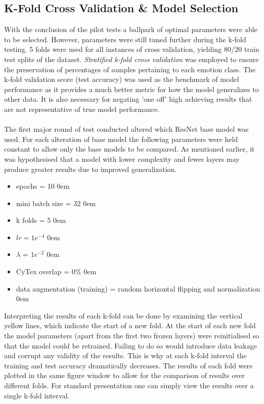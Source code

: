 \subsection{K-Fold Cross Validation \& Model Selection}
With the conclusion of the pilot tests a ballpark of optimal parameters were able to be selected. However, parameters were still tuned further during the k-fold testing. 5 folds were used for all instances of cross validation, yielding 80/20 train test splits of the dataset. \textit{Stratified k-fold cross validation} was employed to ensure the preservation of percentages of samples pertaining to each emotion class. The k-fold validation score (test accuracy) was used as the benchmark of model performance as it provides a much better metric for how the model generalizes to other data. It is also necessary for negating 'one off' high achieving results that are not representative of true model performance.\\ \\
The first major round of test conducted altered which ResNet base model was used. For each alteration of base model the following parameters were held constant to allow only the base models to be compared. As mentioned earlier, it was hypothesised that a model with lower complexity and fewer layers may produce greater results due to improved generalization. 
\begin{itemize}
    \item epochs = 10
    \itemsep0em
    \item mini batch size = 32
    \itemsep0em
    \item k folds = 5
    \itemsep0em
    \item $lr = 1e^{-4}$
    \itemsep0em
    \item $\lambda$ = $1e^{-2}$
    \itemsep0em
    \item CyTex overlap = $0\%$
    \itemsep0em
    \item data augmentation (training) = random horizontal flipping and normalization
    \itemsep0em
\end{itemize}
Interpreting the results of each k-fold can be done by examining the vertical yellow lines, which indicate the start of a new fold. At the start of each new fold the model parameters (apart from the first two frozen layers) were reinitialised so that the model could be retrained. Failing to do so would introduce data leakage and corrupt any validity of the results. This is why at each k-fold interval the training and test accuracy dramatically decreases. The results of each fold were plotted in the same figure window to allow for the comparison of results over different folds. For standard presentation one can simply view the results over a single k-fold interval.

